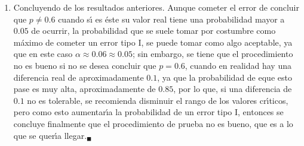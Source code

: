 \begin{solucion}
\begin{enumerate}
  \item Concluyendo de los resultados anteriores. Aunque cometer el error de concluir que $p\neq 0.6$ cuando s\'{\i} es \'este su valor real tiene una probabilidad mayor a $0.05$ de ocurrir, la probabilidad que se suele tomar por costumbre como m\'aximo de cometer un error tipo I, se puede tomar como algo aceptable, ya que en este caso $\alpha \approx 0.06 \approx 0.05$; sin embargo, se tiene que el procedimiento no es bueno si no se desea concluir que $p=0.6$, cuando en realidad hay una diferencia real de aproximadamente $0.1$, ya que la probabilidad de eque esto pase es muy alta, aproximadamente de $0.85$, por lo que, si una diferencia de $0.1$ no es tolerable, se recomienda disminuir el rango de los valores cr\'{\i}ticos, pero como esto aumentar\'{\i}a la probabilidad de un error tipo I, entonces se concluye finalmente que el procedimiento de prueba no es bueno, que es a lo que se quer\'{\i}a llegar.${}_{\blacksquare}$
 \end{enumerate}
\end{solucion}
